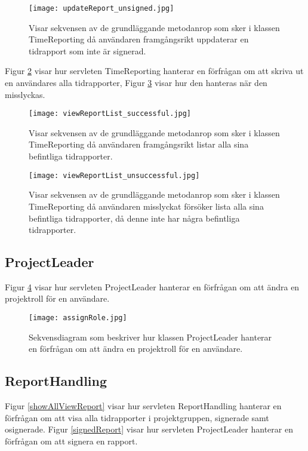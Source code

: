 \documentclass[a4paper]{article}
\begin{document}
\begin{figure}[h!]
\centering
\texttt{[image: updateReport\_unsigned.jpg]}
\caption{Visar sekvensen av de grundläggande metodanrop som sker i klassen TimeReporting då användaren framgångsrikt uppdaterar en tidrapport som inte är signerad.
\label{updateReportUnsigned}}
\end{figure}

\noindent
Figur \ref{viewReportList} visar hur servleten TimeReporting hanterar en förfrågan om att skriva ut en användares alla tidrapporter, Figur \ref{viewReportListFail} visar hur den hanteras när den misslyckas.

\begin{figure}[h!]
\centering
\texttt{[image: viewReportList\_successful.jpg]}
\caption{Visar sekvensen av de grundläggande metodanrop som sker i klassen TimeReporting då användaren framgångsrikt listar alla sina befintliga tidrapporter.
\label{viewReportList}}
\end{figure}

\begin{figure}[h!]
\centering
\texttt{[image: viewReportList\_unsuccessful.jpg]}
\caption{Visar sekvensen av de grundläggande metodanrop som sker i klassen TimeReporting då användaren misslyckat försöker lista alla sina befintliga tidrapporter, då denne inte har några befintliga tidrapporter.
\label{viewReportListFail}}
\end{figure}


\subsection{ProjectLeader}
Figur \ref{assignRole} visar hur servleten ProjectLeader hanterar en förfrågan om att ändra en projektroll för en användare.

\begin{figure}[h!]
\centering
\texttt{[image: assignRole.jpg]}
\caption{Sekvensdiagram som beskriver hur klassen ProjectLeader hanterar en förfrågan om att ändra en projektroll för en användare.
\label{assignRole}}
\end{figure}

\subsection{ReportHandling}

Figur \ref{showAllViewReport} visar hur servleten ReportHandling hanterar en förfrågan om att visa alla tidrapporter i projektgruppen, signerade samt osignerade. Figur \ref{signedReport} visar hur servleten ProjectLeader hanterar en förfrågan om att signera en rapport.
\end{document}
